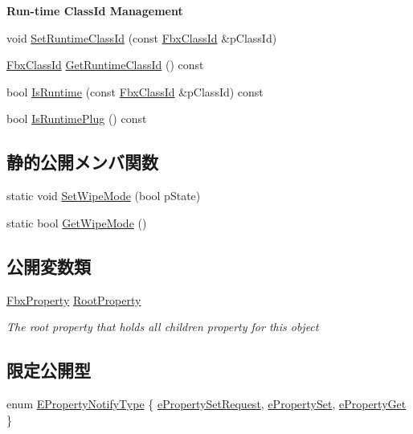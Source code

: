 \begin{Indent}\textbf{ Run-\/time Class\+Id Management}\par
\begin{DoxyCompactItemize}
\item 
void \hyperlink{class_fbx_object_af9273215e168b14d12a4a3e393e061c9}{Set\+Runtime\+Class\+Id} (const \hyperlink{class_fbx_class_id}{Fbx\+Class\+Id} \&p\+Class\+Id)
\item 
\hyperlink{class_fbx_class_id}{Fbx\+Class\+Id} \hyperlink{class_fbx_object_ad81de7de1ede009e3d80361450620475}{Get\+Runtime\+Class\+Id} () const
\item 
bool \hyperlink{class_fbx_object_ac1f9e5981fbf87911d669e078495cb09}{Is\+Runtime} (const \hyperlink{class_fbx_class_id}{Fbx\+Class\+Id} \&p\+Class\+Id) const
\item 
bool \hyperlink{class_fbx_object_a4c804ecb85faa0544d305d9f7e98d777}{Is\+Runtime\+Plug} () const
\end{DoxyCompactItemize}
\end{Indent}
\subsection*{静的公開メンバ関数}
\begin{DoxyCompactItemize}
\item 
static void \hyperlink{class_fbx_object_adbd35588cd04556b1a7fc5ffdee8b417}{Set\+Wipe\+Mode} (bool p\+State)
\item 
static bool \hyperlink{class_fbx_object_a14b73206429c6b2e9c4d6d934721d43a}{Get\+Wipe\+Mode} ()
\end{DoxyCompactItemize}
\subsection*{公開変数類}
\begin{DoxyCompactItemize}
\item 
\hyperlink{class_fbx_property}{Fbx\+Property} \hyperlink{class_fbx_object_a865ee4dfaa7a8f9050105d4477288da8}{Root\+Property}
\begin{DoxyCompactList}\small\item\em The root property that holds all children property for this object \end{DoxyCompactList}\end{DoxyCompactItemize}
\subsection*{限定公開型}
\begin{DoxyCompactItemize}
\item 
enum \hyperlink{class_fbx_object_a528f1b2c2b7abbd64c525ba3a9a496b8}{E\+Property\+Notify\+Type} \{ \hyperlink{class_fbx_object_a528f1b2c2b7abbd64c525ba3a9a496b8affa165977a0461dc2a0e7bb8be0bf579}{e\+Property\+Set\+Request}, 
\hyperlink{class_fbx_object_a528f1b2c2b7abbd64c525ba3a9a496b8af47dd22cb4d60ba4861c8cd207641b97}{e\+Property\+Set}, 
\hyperlink{class_fbx_object_a528f1b2c2b7abbd64c525ba3a9a496b8ab4617c2c302417634591f8a1d39b04ea}{e\+Property\+Get}
 \}
\end{DoxyCompactItemize}

